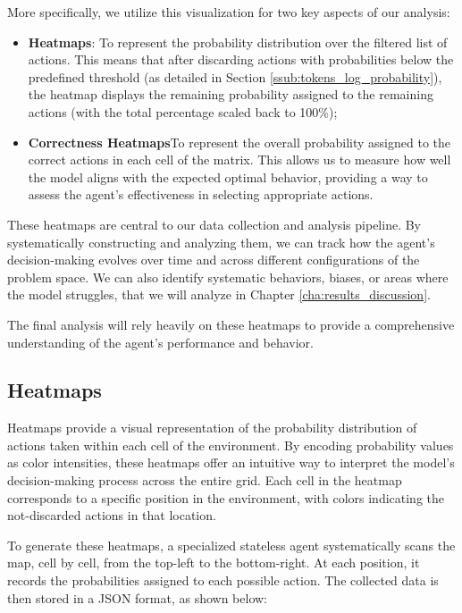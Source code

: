 More specifically, we utilize this visualization for two key aspects of our
analysis:

\begin{itemize}
  \item \textbf{Heatmaps}: To represent the probability distribution over the filtered
    list of actions. This means that after discarding actions with probabilities
    below the predefined threshold (as detailed in Section \ref{ssub:tokens_log_probability}),
    the heatmap displays the remaining probability assigned to the remaining actions
    (with the total percentage scaled back to 100\%);

  \item \textbf{Correctness Heatmaps}To represent the overall probability assigned
    to the correct actions in each cell of the matrix. This allows us to measure
    how well the model aligns with the expected optimal behavior, providing a way
    to assess the agent's effectiveness in selecting appropriate actions.
\end{itemize}

These heatmaps are central to our data collection and analysis pipeline. By
systematically constructing and analyzing them, we can track how the agent's decision-making
evolves over time and across different configurations of the problem space. We
can also identify systematic behaviors, biases, or areas where the model
struggles, that we will analyze in Chapter \ref{cha:results_discussion}.

The final analysis will rely heavily on these heatmaps to provide a comprehensive
understanding of the agent's performance and behavior.

\subsection{Heatmaps}
\label{sub:heatmaps}

Heatmaps provide a visual representation of the probability distribution of
actions taken within each cell of the environment. By encoding probability values
as color intensities, these heatmaps offer an intuitive way to interpret the
model's decision-making process across the entire grid. Each cell in the heatmap
corresponds to a specific position in the environment, with colors indicating
the not-discarded actions in that location.

To generate these heatmaps, a specialized stateless agent systematically scans the
map, cell by cell, from the top-left to the bottom-right. At each position, it records
the probabilities assigned to each possible action. The collected data is then
stored in a JSON format, as shown below:

